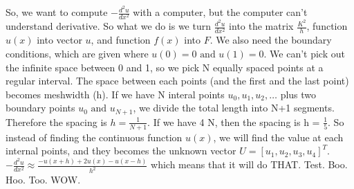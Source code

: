 So, we want to compute \(-\frac{d^2 u}{dx^2}\) with a computer, but the computer can't understand derivative. 
So what we do is we turn \(\frac{d^2 u}{dx^2}\)  into the matrix \(\frac{K^2}{h}\),
function \(u(x)\)  into vector \(u\), and function \(f(x)\) into \(F\).
We also need the boundary conditions, which are given where \(u(0) = 0 \text{ and } u(1)=0\). 
We can't pick out the infinite space between 0 and 1, so we pick N equally spaced points at a regular interval. 
The space between each points (and the first and the last point) becomes meshwidth (h). 
If we have N interal points \(u_0, u_1, u_2, \ldots\) plus two boundary points \(u_0 \text{ and } u_{N+1}\), we divide the total length into N+1 segments.
Therefore the spacing is \(h = \frac{1}{N+1}\).
If we have 4 N, then the spacing is h = \(\frac{1}{5}\).
So instead of finding the continuous function \(u(x)\), we will find the value at each internal points, and they becomes the unknown vector \(U = [u_1, u_2, u_3, u_4]^T\).
\medbreak
\(-\frac{d^2 u}{dx^2} \approx  \frac{-u(x+h) + 2u(x) - u(x-h)}{h^2}\) which means that it will do THAT. Test. Boo. Hoo. Too. WOW.
